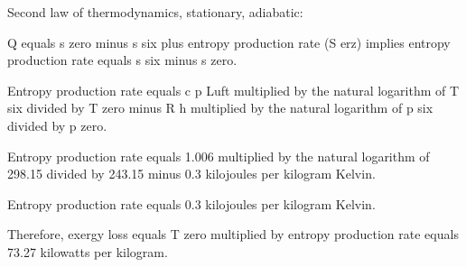 Second law of thermodynamics, stationary, adiabatic:  

Q equals s zero minus s six plus entropy production rate (S erz) implies entropy production rate equals s six minus s zero.  

Entropy production rate equals c p Luft multiplied by the natural logarithm of T six divided by T zero minus R h multiplied by the natural logarithm of p six divided by p zero.  

Entropy production rate equals 1.006 multiplied by the natural logarithm of 298.15 divided by 243.15 minus 0.3 kilojoules per kilogram Kelvin.  

Entropy production rate equals 0.3 kilojoules per kilogram Kelvin.  

Therefore, exergy loss equals T zero multiplied by entropy production rate equals 73.27 kilowatts per kilogram.